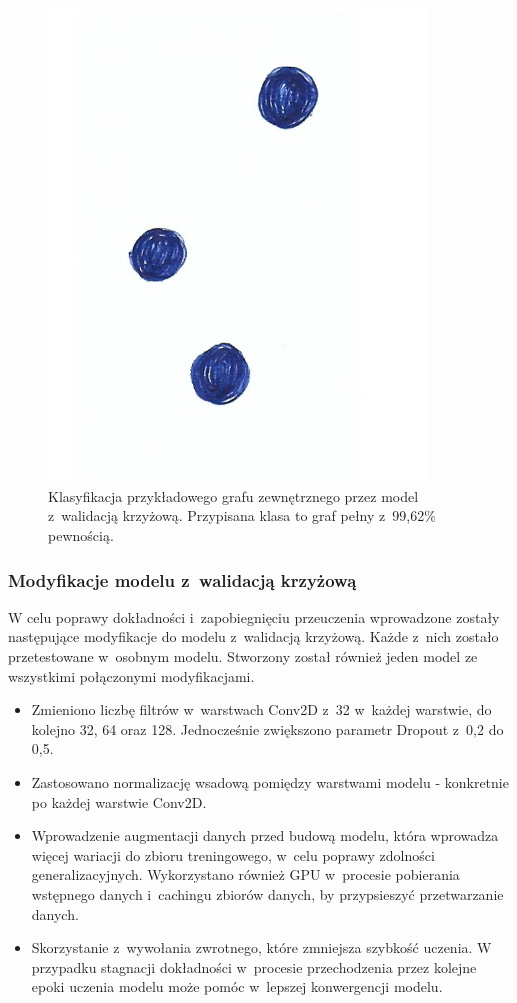 \begin{figure}[ht]
	\centering
	\includegraphics[width=10cm]{../graph_classification/test_graphs/drawn/empty-1.png}
	\caption{Klasyfikacja przykładowego grafu zewnętrznego przez model z~walidacją krzyżową.
		Przypisana klasa to graf pełny z~99,62\% pewnością.}
	\label{Fig:tests-cv-0d}
\end{figure}
\FloatBarrier

\subsubsection{Modyfikacje modelu z~walidacją krzyżową}

W celu poprawy dokładności i~zapobiegnięciu przeuczenia wprowadzone
zostały następujące modyfikacje do modelu z~walidacją krzyżową.
Każde z~nich zostało przetestowane w~osobnym modelu.
Stworzony został również jeden model ze wszystkimi połączonymi modyfikacjami. 
\begin{itemize}[label=-,labelsep=0.4cm,leftmargin=0.6cm]
    \item Zmieniono liczbę filtrów w~warstwach Conv2D z~32 w~każdej warstwie, do kolejno 32, 64 oraz 128.
		Jednocześnie zwiększono parametr Dropout z~0,2 do 0,5.
    \item Zastosowano normalizację wsadową pomiędzy warstwami modelu - konkretnie po każdej warstwie Conv2D.
    \item Wprowadzenie augmentacji danych przed budową modelu, która wprowadza więcej wariacji do zbioru treningowego,
		w~celu poprawy zdolności generalizacyjnych.
		Wykorzystano również GPU w~procesie pobierania wstępnego danych i~cachingu zbiorów danych, by przypsieszyć przetwarzanie danych.
	\item Skorzystanie z~wywołania zwrotnego, które zmniejsza szybkość uczenia.
		W przypadku stagnacji dokładności w~procesie przechodzenia przez kolejne epoki uczenia modelu
		może pomóc w~lepszej konwergencji modelu.
\end{itemize}

